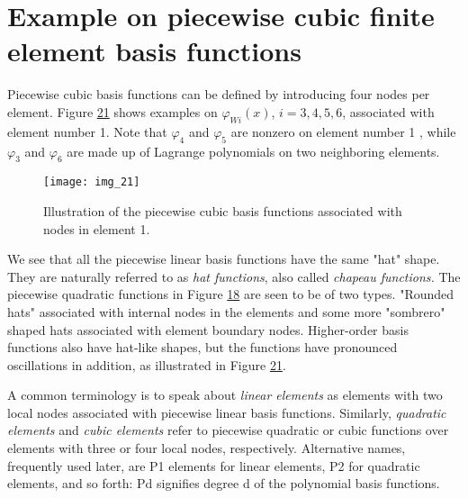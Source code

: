 \documentclass[../main.tex]{subfiles}
\begin{document}
\section[Example on piecewise cubic finite element basis functions]{Example on piecewise cubic finite element basis functions}
\label{sec:sec_3_5}
Piecewise cubic basis functions can be defined by introducing four nodes per element. Figure \hyperref[fig:img_21]{21} shows examples on $\varphi_{Wi}(x)$, $i=3,4,5,6$, associated with element number 1. Note that $\varphi_{4}$ and $\varphi_{5}$ are nonzero on element number 1 , while $\varphi_{3}$ and $\varphi_{6}$ are made up of Lagrange polynomials on two neighboring elements.
\begin{figure}[H]
	\centering
	\texttt{[image: img\_21]}
	\caption{Illustration of the piecewise cubic basis functions associated with
		nodes in element 1.}
	\label{fig:img_21}
\end{figure}

We see that all the piecewise linear basis functions have the same "hat" shape.
They are naturally referred to as \textit{hat functions}, also called \textit{chapeau functions.}
The piecewise quadratic functions in Figure \hyperref[fig:img_18]{18} are seen to be of two types.
"Rounded hats" associated with internal nodes in the elements and some more
"sombrero" shaped hats associated with element boundary nodes. Higher-order
basis functions also have hat-like shapes, but the functions have pronounced
oscillations in addition, as illustrated in Figure \hyperref[fig:img_21]{21}.

A common terminology is to speak about \textit{linear elements} as elements with two
local nodes associated with piecewise linear basis functions. Similarly, \textit{quadratic
elements} and \textit{cubic elements} refer to piecewise quadratic or cubic functions
over elements with three or four local nodes, respectively. Alternative names,
frequently used later, are P1 elements for linear elements, P2 for quadratic
elements, and so forth: Pd signifies degree d of the polynomial basis functions.
\end{document}
